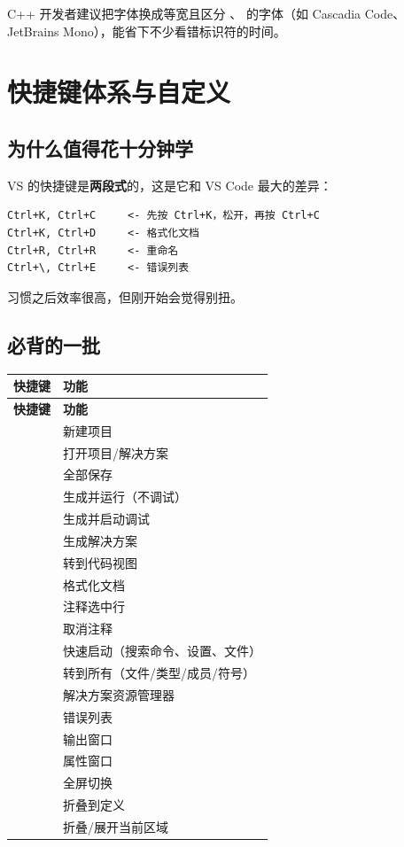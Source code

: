 \begin{tipbox}[提示]
C++ 开发者建议把字体换成等宽且区分 、 的字体（如 Cascadia Code、JetBrains Mono），能省下不少看错标识符的时间。
\end{tipbox}

\section{快捷键体系与自定义}

\subsection{为什么值得花十分钟学}

VS 的快捷键是\textbf{两段式}的，这是它和 VS Code 最大的差异：

\begin{lstlisting}[style=textstyle]
Ctrl+K, Ctrl+C     <- 先按 Ctrl+K，松开，再按 Ctrl+C
Ctrl+K, Ctrl+D     <- 格式化文档
Ctrl+R, Ctrl+R     <- 重命名
Ctrl+\, Ctrl+E     <- 错误列表
\end{lstlisting}

习惯之后效率很高，但刚开始会觉得别扭。

\subsection{必背的一批}

\begin{longtable}{L{4.4cm}L{10.6cm}}\toprule
\textbf{快捷键} & \textbf{功能} \\ \midrule \endfirsthead
\toprule \textbf{快捷键} & \textbf{功能} \\ \midrule \endhead
\bottomrule \endlastfoot
{} & 新建项目 \\
 & 打开项目/解决方案 \\
 & 全部保存 \\
 & 生成并运行（不调试） \\
 & 生成并启动调试 \\
 & 生成解决方案 \\
 & 转到代码视图 \\
 & 格式化文档 \\
 & 注释选中行 \\
 & 取消注释 \\
 & 快速启动（搜索命令、设置、文件） \\
 & 转到所有（文件/类型/成员/符号） \\
 & 解决方案资源管理器 \\
 & 错误列表 \\
 & 输出窗口 \\
 & 属性窗口 \\
 & 全屏切换 \\
 & 折叠到定义 \\
 & 折叠/展开当前区域 \\
\end{longtable}

